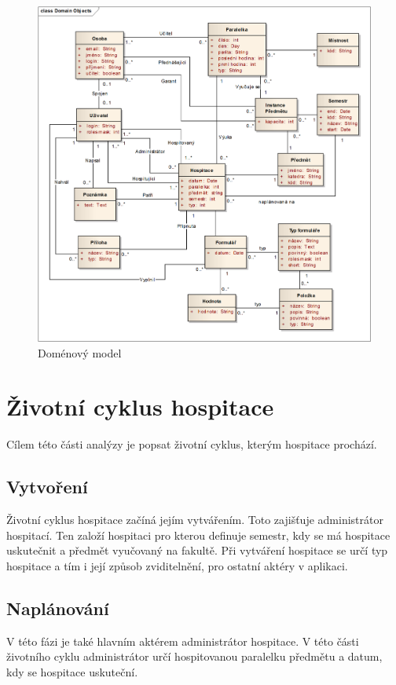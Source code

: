 \begin{figure}[p]
\begin{center}
\includegraphics[width=16cm]{figures/DomainModel}
\caption{Doménový model}
\label{fig:domainmodel}
\end{center}
\end{figure}

\section{Životní cyklus hospitace}
Cílem této části analýzy je popsat životní cyklus, kterým hospitace prochází. 

\subsection{Vytvoření}
Životní cyklus hospitace začíná jejím vytvářením. Toto zajišťuje administrátor hospitací. Ten založí hospitaci pro kterou definuje semestr, kdy se má hospitace uskutečnit a předmět vyučovaný na fakultě. Při vytváření hospitace se určí typ hospitace a tím i její způsob zviditelnění, pro ostatní aktéry v aplikaci.

\subsection{Naplánování}
V této fázi je také hlavním aktérem administrátor hospitace. V této části životního cyklu administrátor určí hospitovanou paralelku předmětu a datum,  kdy se hospitace uskuteční.  

